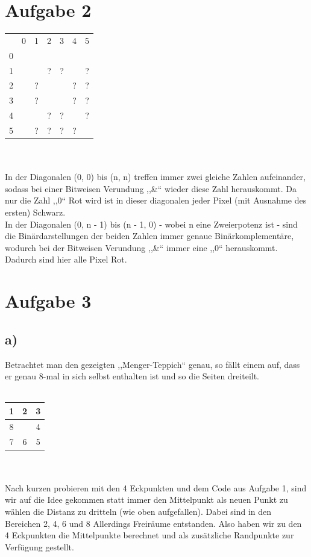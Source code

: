 \documentclass[10pt,a4paper]{article}
\begin{document}
\section{Aufgabe 2}
 \begin{tabular}{ccccccc}
    & 0 & 1 & 2 & 3 & 4 & 5\\
  0 & \cellcolor{red} & \cellcolor{red} & \cellcolor{red} & \cellcolor{red} & \cellcolor{red} & \cellcolor{red}\\
  1 & \cellcolor{red} & \cellcolor{black} & ? & ? & \cellcolor{red} & ?\\
  2 & \cellcolor{red} & ? & \cellcolor{black} & \cellcolor{red} & ? & ?\\
  3 & \cellcolor{red} & ? & \cellcolor{red} & \cellcolor{black} & ? & ?\\
  4 & \cellcolor{red} & \cellcolor{red} & ? & ? & \cellcolor{black} & ?\\
  5 & \cellcolor{red} & ? & ? & ? & ? & \cellcolor{black}\\
 \end{tabular}
 \\
 \\
In der Diagonalen (0, 0) bis (n, n) treffen immer zwei gleiche Zahlen aufeinander, sodass bei einer Bitweisen Verundung ,,\&`` wieder diese Zahl herauskommt. Da nur die Zahl ,,0`` Rot wird ist in dieser diagonalen jeder Pixel (mit Ausnahme des ersten) Schwarz.
\\
In der Diagonalen (0, n - 1) bis (n - 1, 0) - wobei n eine Zweierpotenz ist - sind die Binärdarstellungen der beiden Zahlen immer genaue Binärkomplementäre, wodurch bei der Bitweisen Verundung ,,\&`` immer eine ,,0`` herauskommt. Dadurch sind hier alle Pixel Rot.

\section{Aufgabe 3}
\subsection*{a)}
Betrachtet man den gezeigten ,,Menger-Teppich`` genau, so fällt einem auf, dass er genau 8-mal in sich selbst enthalten ist und so die Seiten dreiteilt.
\\
 \\
 \begin{tabular}{|c|c|c|} \hline
	  1 & 2 & 3 \\ \hline
	  8 &   & 4 \\ \hline
	  7 & 6 & 5 \\ \hline
 \end{tabular}
 \\
 \\
 Nach kurzen probieren mit den 4 Eckpunkten und dem Code aus Aufgabe 1, sind wir auf die Idee gekommen statt immer den Mittelpunkt als neuen Punkt zu wählen die Distanz zu dritteln (wie oben aufgefallen). Dabei sind in den Bereichen 2, 4, 6 und 8 Allerdings Freiräume entstanden. Also haben wir zu den 4 Eckpunkten die Mittelpunkte berechnet und als zusätzliche Randpunkte zur Verfügung gestellt.
\end{document}
